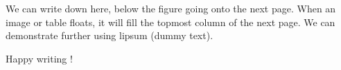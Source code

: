 We can write down here, below the figure going onto the next page. When an image or table floats, it will fill the topmost column of the next page. We can demonstrate further using lipsum (dummy text). \hfill \break
\lipsum[1-2] \hfill \break \break 

Happy writing \cite{alexandrov2004write}!